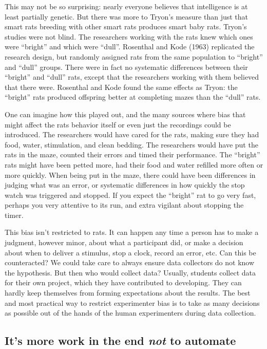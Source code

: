 \documentclass[
  12pt,
]{book}
\begin{document}
This may not be so surprising: nearly everyone believes that intelligence is at least partially genetic. But there was more to Tryon's measure than just that smart rats breeding with other smart rats produces smart baby rats. Tryon's studies were not blind. The researchers working with the rats knew which ones were ``bright'' and which were ``dull''. Rosenthal and Kode (1963) replicated the research design, but randomly assigned rats from the same population to ``bright'' and ``dull'' groups. There were in fact no systematic differences between their ``bright'' and ``dull'' rats, except that the researchers working with them believed that there were. Rosenthal and Kode found the same effects as Tryon: the ``bright'' rats produced offspring better at completing mazes than the ``dull'' rats.

One can imagine how this played out, and the many sources where bias that might affect the rats behavior itself or even just the recordings could be introduced. The researchers would have cared for the rats, making sure they had food, water, stimulation, and clean bedding. The researchers would have put the rats in the maze, counted their errors and timed their performance. The ``bright'' rats might have been petted more, had their food and water refilled more often or more quickly. When being put in the maze, there could have been differences in judging what was an error, or systematic differences in how quickly the stop watch was triggered and stopped. If you expect the ``bright'' rat to go very fast, perhaps you very attentive to its run, and extra vigilant about stopping the timer.

This bias isn't restricted to rats. It can happen any time a person has to make a judgment, however minor, about what a participant did, or make a decision about when to deliver a stimulus, stop a clock, record an error, etc. Can this be counteracted? We could take care to always ensure data collectors do not know the hypothesis. But then who would collect data? Usually, students collect data for their own project, which they have contributed to developing. They can hardly keep themselves from forming expectations about the results. The best and most practical way to restrict experimenter bias is to take as many decisions as possible out of the hands of the human experimenters during data collection.

\subsection{\texorpdfstring{It's more work in the end \emph{not} to automate}{It's more work in the end not to automate}}\label{its-more-work-in-the-end-not-to-automate}
\end{document}
